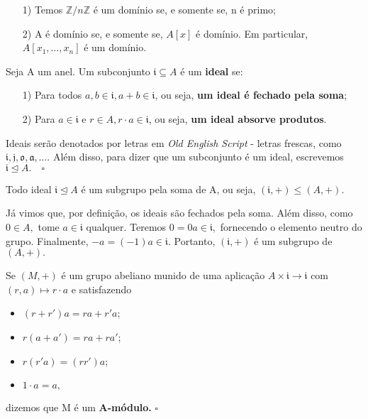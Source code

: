 \documentclass[algebraII_notes.tex]{subfiles}
\begin{document}
\begin{example}[Exercício]
	\begin{itemize}
		\item[1)] Temos \(\mathbb{Z}/n \mathbb{Z}\) é um domínio se, e somente se, n é primo;
		\item[2)] A é domínio se, e somente se, \(A[x]\) é domínio. Em particular, \(A[x_{1}, \dotsc , x_{n}]\) é um domínio.
	\end{itemize}
\end{example}
\begin{def*}
	Seja A um anel. Um subconjunto \(\mathfrak{i}\subseteq{A}\) é um \textbf{ideal} se:
	\begin{itemize}
		\item[1)] Para todos \(a, b\in \mathfrak{i}, a + b\in \mathfrak{i}\), ou seja, \textbf{um ideal é fechado pela soma};
		\item[2)] Para \(a\in \mathfrak{i}\) e \(r\in A, r \cdot a\in \mathfrak{i}\), ou seja, \textbf{um ideal absorve produtos}.
	\end{itemize}
	Ideais serão denotados por letras em \textit{Old English Script} - letras frescas, como \(\mathfrak{i}, \mathfrak{j}, \mathfrak{o}, \mathfrak{a}, \dotsc\).
	Além disso, para dizer que um subconjunto é um ideal, escrevemos \(\mathfrak{i} \trianglelefteq{A}.\quad\square\)
\end{def*}
\begin{prop*}
	Todo ideal \(\mathfrak{i}\trianglelefteq{A}\) é um subgrupo pela soma de A, ou seja, \((\mathfrak{i}, +)\leq (A, +).\)
\end{prop*}
\begin{proof*}
	Já vimos que, por definição, os ideais são fechados pela soma. Além disso, como \(0\in A,\)
	tome \(a\in \mathfrak{i}\) qualquer. Teremos \(0 = 0a\in \mathfrak{i},\) fornecendo o elemento neutro do grupo.
	Finalmente, \(-a = (-1)a\in \mathfrak{i}\). Portanto, \((\mathfrak{i}, +)\) é um subgrupo de \((A, +).\) \qedsymbol
\end{proof*}
\begin{def*}
	Se \((M, +)\) é um grupo abeliano munido de uma aplicação \(A\times \mathfrak{i}\longrightarrow \mathfrak{i}\) com \((r, a)\mapsto r \cdot a\)
	e satisfazendo
	\begin{itemize}
		\item \((r + r')a = ra + r'a\);
		\item \(r(a + a') = ra + ra'\);
		\item \(r(r'a) = (rr')a\);
		\item \(1 \cdot a = a,\)
	\end{itemize}
	dizemos que M é um \textbf{A-módulo.} \(\square\)
\end{def*}
\end{document}
